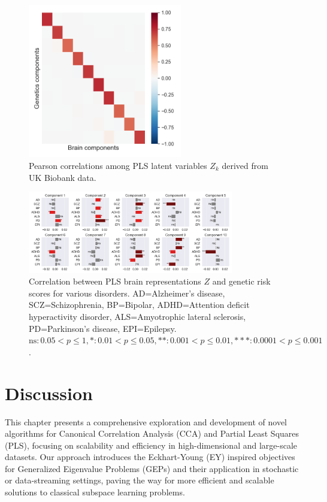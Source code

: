 \begin{figure}
    \centering
    \includegraphics[width=0.6\textwidth,trim={0.8cm 0cm 0.3cm 0cm}]{figures/UKBB/cross_corr.png}
    \caption{Pearson correlations among PLS latent variables \( Z_k \) derived from UK Biobank data.}
    \label{fig:UKBB_corr}
\end{figure}

\begin{figure}
    \centering
    \includegraphics[width=0.8\textwidth,trim={0.5cm 0cm 0.7cm 0cm}]{figures/UKBB/prs_correlations.png}
    \caption{Correlation between PLS brain representations \( Z \) and genetic risk scores for various disorders. AD=Alzheimer's disease, SCZ=Schizophrenia, BP=Bipolar, ADHD=Attention deficit hyperactivity disorder, ALS=Amyotrophic lateral sclerosis, PD=Parkinson's disease, EPI=Epilepsy. $\text{ns}: 0.05< p \leq 1, \ast: 0.01< p \leq 0.05, \ast\ast: 0.001< p \leq 0.01, \ast\ast\ast: 0.0001< p \leq 0.001$.}
    \label{fig:genetic_risk}
\end{figure}

\section{Discussion}

This chapter presents a comprehensive exploration and development of novel algorithms for Canonical Correlation Analysis (CCA) and Partial Least Squares (PLS), focusing on scalability and efficiency in high-dimensional and large-scale datasets.
Our approach introduces the Eckhart-Young (EY) inspired objectives for Generalized Eigenvalue Problems (GEPs) and their application in stochastic or data-streaming settings, paving the way for more efficient and scalable solutions to classical subspace learning problems.

